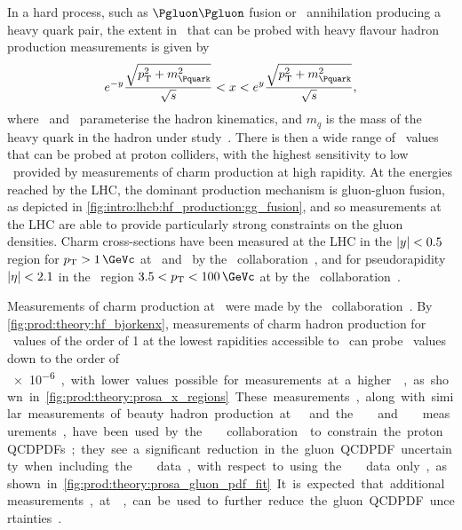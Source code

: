 In a hard  process, such as $\Pgluon\Pgluon$ fusion or \qqbar\ 
annihilation producing a heavy quark pair, the extent in \bjorkenx\ that can be 
probed with heavy flavour hadron production measurements is given by
\begin{equation}
  e^{-\rapidity}\frac{%
    \sqrt{\pT^{2} + m_{\Pquark}^{2}}
  }{%
    \sqrts
  } < x < e^{\rapidity}\frac{%
    \sqrt{\pT^{2} + m_{\Pquark}^{2}}
  }{%
    \sqrts
  },
  \label{fig:prod:theory:hf_bjorkenx}
\end{equation}
where \rapidity\ and \pT\ parameterise the hadron kinematics, and $m_{q}$ is 
the mass of the heavy quark in the hadron under study~\cite{Zenaiev:2015rfa}.
There is then a wide range of \bjorkenx\ values that can be probed at proton 
colliders, with the highest sensitivity to low \bjorkenx\ provided by 
measurements of charm production at high rapidity.
At the energies reached by the \ac{LHC}, the dominant production mechanism is 
gluon-gluon fusion, as depicted in 
\cref{fig:intro:lhcb:hf_production:gg_fusion}, and so measurements at the 
\ac{LHC} are able to provide particularly strong constraints on the gluon 
densities.
Charm cross-sections have been measured at the \ac{LHC} in the $|y| < 
0.5$ region for $\pT > \SI{1}{\GeVc}$ at \sqrtseq{2.76}\ and \sqrtseq{7}\ by 
the \alice\ collaboration~\cite{Abelev:2012sx,ALICE:2012ik,ALICE:2011aa},
and for pseudorapidity $|\eta| < 2.1$ in the \pT\ region $3.5 < \pT < 
\SI{100}{\GeVc}$ at \sqrtseq{7} by the \atlas\ 
collaboration~\cite{Aad:2015zix}.

Measurements of charm production at \ were made by the \lhcb\ 
collaboration~\cite{LHCb-PAPER-2012-041}.
By \cref{fig:prod:theory:hf_bjorkenx}, measurements of charm hadron production 
for \pT\ values of the order of \SI{1}{\GeVc} at the lowest rapidities 
accessible to \lhcb\ can probe \bjorkenx\ values down to the order of \SI{e-6}, 
with lower values possible for measurements at a higher \sqrts, as shown in 
\cref{fig:prod:theory:prosa_x_regions}.
These measurements, along with similar measurements of beauty hadron production 
at \lhcb~\cite{LHCb-PAPER-2013-004} and the \hone\ and \zeus\ measurements, 
have been used by the \prosa\ collaboration~\cite{Zenaiev:2015rfa} to constrain 
the proton \aclp{QCDPDF}; they see a significant reduction in the gluon 
\ac{QCDPDF} uncertainty when including the \lhcb\ data, with respect to using 
the \hera\ data only, as shown in \cref{fig:prod:theory:prosa_gluon_pdf_fit}.
It is expected that additional measurements, at \sqrtseq{13}, can be used to 
further reduce the gluon \ac{QCDPDF} uncertainties~\cite{Gauld:2015yia}.

